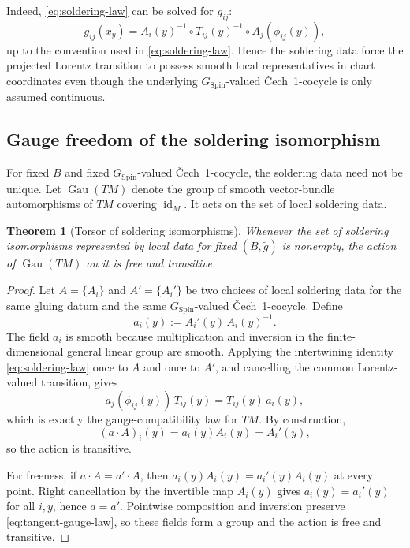 \documentclass[11pt,a4paper]{article}
\newtheorem{theorem}{Theorem}[section]
\theoremstyle{definition}
\theoremstyle{remark}
\newcommand{\SpinG}{G_{\mathrm{Spin}}}
\newcommand{\id}{\operatorname{id}}
\newcommand{\Cech}{\ifmmode\text{\v{C}ech}\else\v{C}ech\fi}
\begin{document}
Indeed, \eqref{eq:soldering-law} can be solved for \(g_{ij}\):
\[
   g_{ij}(x_y)
   =
   A_i(y)^{-1}\circ T_{ij}(y)^{-1}
   \circ A_j(\phi_{ij}(y)),
\tag{7.5}
\]
up to the convention used in \eqref{eq:soldering-law}.  Hence the soldering data force
the projected Lorentz transition to possess smooth local
representatives in chart coordinates even though the underlying \(\SpinG\)-valued \Cech\ 1-cocycle is only assumed continuous.

\subsection{Gauge freedom of the soldering isomorphism}

For fixed \(B\) and fixed \(\SpinG\)-valued \Cech\ 1-cocycle, the soldering data need not be unique.  Let \(\operatorname{Gau}(TM)\) denote the group of smooth vector-bundle automorphisms of \(TM\) covering \(\id_M\).  It acts on the set of local soldering data.

\begin{theorem}[Torsor of soldering isomorphisms]
\label{thm:solder-torsor}
Whenever the set of soldering isomorphisms represented by local data for fixed \((B,\widetilde g)\)
is nonempty, the action of \(\operatorname{Gau}(TM)\) on it is free and transitive.
\end{theorem}

\begin{proof}
Let \(A=\{A_i\}\) and \(A'=\{A_i'\}\) be two choices of local soldering data for the same
gluing datum and the same \(\SpinG\)-valued \Cech\ 1-cocycle.  Define
\[
   a_i(y):=A_i'(y)\,A_i(y)^{-1}.
\tag{7.6}\label{eq:gauge-between-solders}
\]
The field \(a_i\) is smooth because multiplication and inversion in the
finite-dimensional general linear group are smooth.  Applying the intertwining identity \eqref{eq:soldering-law} once to \(A\) and once to \(A'\), and cancelling the common Lorentz-valued transition, gives
\[
   a_j(\phi_{ij}(y))\,T_{ij}(y)
   =T_{ij}(y)\,a_i(y),
\tag{7.7}\label{eq:tangent-gauge-law}
\]
which is exactly the gauge-compatibility law for \(TM\).  By
construction,
\[
   (a\cdot A)_i(y)=a_i(y)A_i(y)=A_i'(y),
\]
so the action is transitive.

For freeness, if \(a\cdot A=a'\cdot A\), then
\(a_i(y)A_i(y)=a_i'(y)A_i(y)\) at every point.  Right cancellation by the
invertible map \(A_i(y)\) gives \(a_i(y)=a_i'(y)\) for all \(i,y\), hence
\(a=a'\).  Pointwise composition and inversion preserve
\eqref{eq:tangent-gauge-law}, so these fields form a group and the action
is free and transitive.
\end{proof}
\end{document}
